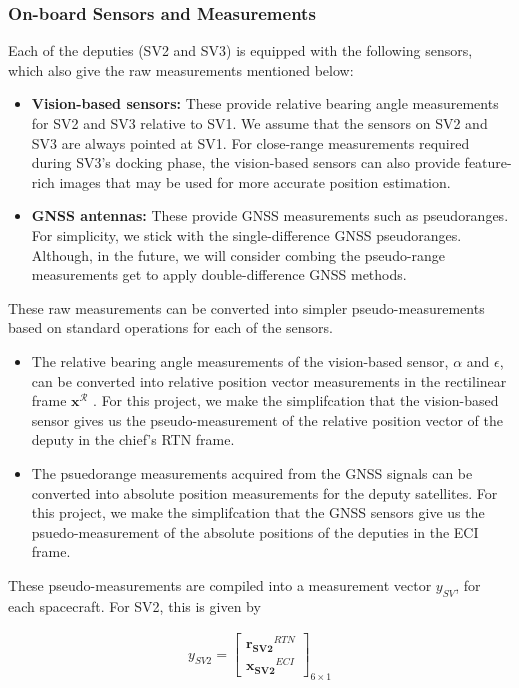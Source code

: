 \subsubsection{On-board Sensors and Measurements}

Each of the deputies (SV2 and SV3) is equipped with the following sensors, which also give the raw measurements mentioned below:
\begin{itemize}
    \item \textbf{Vision-based sensors:} These provide relative bearing angle measurements for SV2 and SV3 relative to SV1. We assume that the sensors on SV2 and SV3 are always pointed at SV1. For close-range measurements required during SV3's docking phase, the vision-based sensors can also provide feature-rich images that may be used for more accurate position estimation. 
    \item \textbf{GNSS antennas:} These provide GNSS measurements such as pseudoranges. For simplicity, we stick with the single-difference GNSS pseudoranges. Although, in the future, we will consider combing the pseudo-range measurements get to apply double-difference GNSS methods.
\end{itemize}

These raw measurements can be converted into simpler pseudo-measurements based on standard operations for each of the sensors. 
\begin{itemize}
    \item The relative bearing angle measurements of the vision-based sensor, $\alpha$ and $\epsilon$, can be converted into relative position vector measurements in the rectilinear frame $\boldsymbol{x}^\mathcal{R}$ \cite{sullivan2020nonlinear}. For this project, we make the simplifcation that the vision-based sensor gives us the pseudo-measurement of the relative position vector of the deputy in the chief's RTN frame.
    \item The psuedorange measurements acquired from the GNSS signals can be converted into absolute position measurements for the deputy satellites. For this project, we make the simplifcation that the GNSS sensors give us the psuedo-measurement of the absolute positions of the deputies in the ECI frame.
\end{itemize}
These pseudo-measurements are compiled into a measurement vector $y_{SV}$, for each spacecraft. For SV2, this is given by

\begin{align}
    y_{SV2} = \begin{bmatrix}
        \boldsymbol{r_{SV2}}^{RTN}\\
        \boldsymbol{x_{SV2}}^{ECI}
    \end{bmatrix}_{6\times 1}
\end{align}

